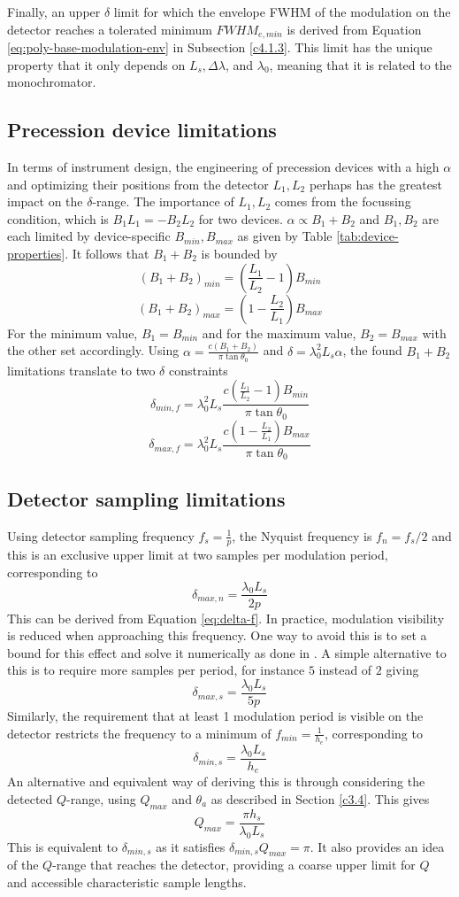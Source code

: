 Finally, an upper $\delta$ limit for which the envelope FWHM of the modulation on the detector reaches a tolerated minimum $FWHM_{e,min}$ is derived from Equation \eqref{eq:poly-base-modulation-env} in Subsection \ref{c4.1.3}. This limit has the unique property that it only depends on $L_s, \Delta\lambda$, and $\lambda_0$, meaning that it is related to the monochromator.

\subsection{Precession device limitations}
\label{c4.1.1}
In terms of instrument design, the engineering of precession devices with a high $\alpha$ and optimizing their positions from the detector $L_1, L_2$ perhaps has the greatest impact on the $\delta$-range. The importance of $L_1, L_2$ comes from the focussing condition, which is $B_1L_1 = -B_2L_2$ for two devices. $\alpha\propto B_1 + B_2$ and $B_1, B_2$ are each limited by device-specific $B_{min}, B_{max}$ as given by Table \ref{tab:device-properties}. It follows that $B_1 + B_2$ is bounded by
$$(B_1 + B_2)_{min} = (\frac{L_1}{L_2} - 1)B_{min}$$
$$(B_1 + B_2)_{max} = (1 - \frac{L_2}{L_1})B_{max}$$
For the minimum value, $B_1 = B_{min}$ and for the maximum value, $B_2 = B_{max}$ with the other set accordingly. Using $\alpha = \frac{c(B_1+B_2)}{\pi\tan\theta_0}$ and $\delta = \lambda_0^2L_s\alpha$, the found $B_1 + B_2$ limitations translate to two $\delta$ constraints
$$\delta_{min, f} = \lambda_0^2 L_s \frac{c(\frac{L_1}{L_2} - 1)B_{min}}{\pi\tan\theta_0}$$
$$\delta_{max, f} = \lambda_0^2 L_s \frac{c(1 - \frac{L_2}{L_1})B_{max}}{\pi\tan\theta_0}$$
\subsection{Detector sampling limitations}
\label{c4.1.2}
Using detector sampling frequency $f_s = \frac{1}{p}$, the Nyquist frequency is $f_n = f_s/2$ and this is an exclusive upper limit at two samples per modulation period, corresponding to 
$$\delta_{max,n} = \frac{\lambda_0L_s}{2p}$$
This can be derived from Equation \eqref{eq:delta-f}. In practice, modulation visibility is reduced when approaching this frequency. One way to avoid this is to set a bound for this effect and solve it numerically as done in \cite{kusmin2017}. A simple alternative to this is to require more samples per period, for instance $5$ instead of $2$ giving
$$\delta_{max,s} = \frac{\lambda_0L_s}{5p}$$
Similarly, the requirement that at least 1 modulation period is visible on the detector restricts the frequency to a minimum of $f_{min} = \frac{1}{h_e}$, corresponding to 
$$\delta_{min,s} = \frac{\lambda_0L_s}{h_e}$$
An alternative and equivalent way of deriving this is through considering the detected $Q$-range, using $Q_{max}$ and $\theta_a$ as described in Section \ref{c3.4}. This gives 
$$Q_{max} = \frac{\pi h_s}{\lambda_0 L_s}$$
This is equivalent to $\delta_{min,s}$ as it satisfies $\delta_{min,s} Q_{max} = \pi$. It also provides an idea of the $Q$-range that reaches the detector, providing a coarse upper limit for $Q$ and accessible characteristic sample lengths. 
